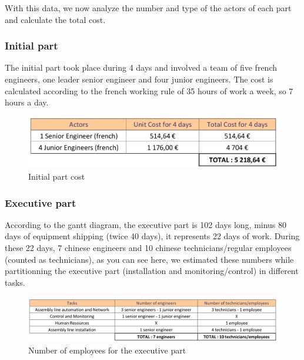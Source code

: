 With this data, we now analyze the number and type of the actors of each part and calculate the total cost.

\subsubsection{Initial part}
	The initial part took place during 4 days and involved a team of five french engineers, one leader senior engineer and four junior engineers.
	The cost is calculated according to the french working rule of 35 hours of work a week, so 7 hours a day.

	\begin{figure}[h]

	\centering
	\includegraphics[scale=0.6]{Img/firstPartHumanCost.png}
	\caption{Initial part cost}

	\end{figure}

\subsubsection{Executive part}
	According to the gantt diagram, the executive part is 102 days long, minus 80 days of equipment shipping (twice 40 days), it represents 22 days of work.
	During these 22 days, 7 chinese engineers and 10 chinese technicians/regular employees (counted as technicians), as you can see here, we estimated these numbers while partitionning the executive part (installation and monitoring/control) in different tasks. \\

	\begin{figure}[h]

	\centering
	\includegraphics[scale=0.6]{Img/secondPartNbrHuman.png}
	\caption{Number of employees for the executive part}

	\end{figure}

